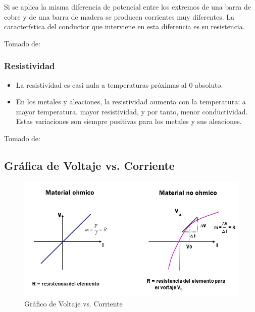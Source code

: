 \documentclass[letterpaper, 12pt]{report}
\begin{document}
\bigskip

Si se aplica la misma diferencia  de potencial entre los extremos de una
barra de cobre y de una barra de madera  se producen corrientes muy diferentes.
La característica del conductor que  interviene en esta diferencia es su
resistencia.

\smallskip

Tomado de:~\cite{TemperaturaResistencia}

\subsubsection{Resistividad}

\begin{itemize}
	\item La resistividad es casi nula a temperaturas próximas al 0 absoluto.
	\item En los metales y aleaciones, la resistividad aumenta con la
	      temperatura: a mayor temperatura, mayor resistividad, y por tanto,
	      menor conductividad. Estas variaciones son siempre positivas para los
	      metales y sus aleaciones.
\end{itemize}

\smallskip

Tomado de:~\cite{TemperaturaResistividad}

\subsection{Gráfica de Voltaje vs. Corriente}

\begin{figure}[H]
	\begin{center}
		\includegraphics[scale = 0.5]{./Images/VoltajeVsResistencia.jpg}
		\caption{Gráfico de Voltaje vs. Corriente}
		\label{img:graficoResistencias}
	\end{center}
\end{figure}
\end{document}

